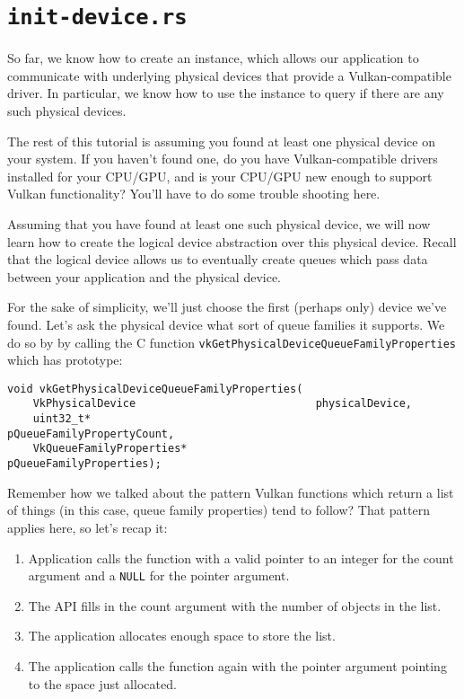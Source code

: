 \documentclass[12pt,letterpaper]{article}
\newcommand{\cil}[1]{\texttt{#1}}
\newcommand{\vulkanquerypattern}{
	\begin{enumerate}
		\item Application calls the function with a valid pointer to an integer for the count argument and a \cil{NULL} for the pointer argument.
		
		\item The API fills in the count argument with the number of objects in the list.
		
		\item The application allocates enough space to store the list.
		
		\item The application calls the function again with the pointer argument pointing to the space just allocated.
	\end{enumerate}
}
\begin{document}
\section{\texttt{init-device.rs}}

So far, we know how to create an instance, which allows our application to communicate with underlying physical devices that provide a Vulkan-compatible driver. In particular, we know how to use the instance to query if there are any such physical devices. 

The rest of this tutorial is assuming you found at least one physical device on your system. If you haven't found one, do you have Vulkan-compatible drivers installed for your CPU/GPU, and is your CPU/GPU new enough to support Vulkan functionality? You'll have to do some trouble shooting here. 

Assuming that you have found at least one such physical device, we will now learn how to create the logical device abstraction over this physical device. Recall that the logical device allows us to eventually create queues which pass data between your application and the physical device. 

For the sake of simplicity, we'll just choose the first (perhaps only) device we've found. Let's ask the physical device what sort of queue families it supports. We do so by by calling the C function \cil{vkGetPhysicalDeviceQueueFamilyProperties} which has prototype:
	\begin{verbatim}
void vkGetPhysicalDeviceQueueFamilyProperties(
	VkPhysicalDevice                            physicalDevice,
	uint32_t*                                   pQueueFamilyPropertyCount,
	VkQueueFamilyProperties*                    pQueueFamilyProperties);
	\end{verbatim}
Remember how we talked about the pattern Vulkan functions which return a list of things (in this case, queue family properties) tend to follow? That pattern applies here, so let's recap it: \vulkanquerypattern
\end{document}
